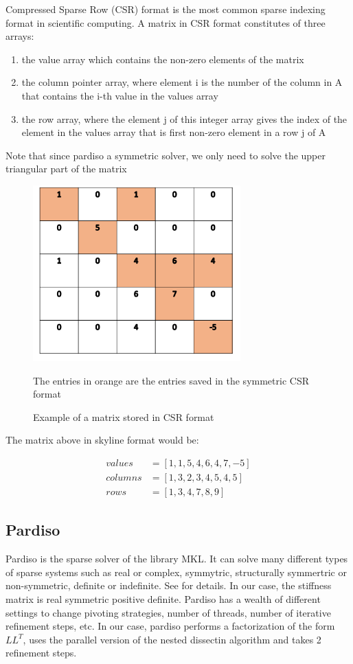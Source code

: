 \documentclass[11pt]{article}
\begin{document}
Compressed Sparse Row (CSR) format is the most common sparse indexing format in scientific computing. A matrix in CSR format constitutes of three arrays:
\begin{enumerate}
\item the value array which contains the non-zero elements of the matrix
\item the column pointer array, where element i is the number of the column in A that contains the i-th value in the values array
\item the row array, where the element j of this integer array gives the index of the element in the values array that is first non-zero element in a row j of A
\end{enumerate}
Note that since pardiso a symmetric solver, we only need to solve the upper triangular part of the matrix
\begin{figure}[H]
\begin{center}

\includegraphics[width=8cm]{csr}
\label{fig:csr}\\
\caption{Example of a matrix stored in CSR format}
The entries in orange are the entries saved in the symmetric CSR format
\end{center}
\end{figure}

The matrix above in skyline format would be:

\begin{align}
values&=[1,1,5,4,6,4,7,-5]\\
columns&= [1,3,2,3,4,5,4,5] \\
rows&= [1,3,4,7,8,9] 
\end{align}

\subsection{Pardiso}
Pardiso is the sparse solver of the library MKL. It can solve many different types of sparse systems such as real or complex, symmytric, structurally symmertric or non-symmetric, definite or indefinite. See \cite{Intel} for details. In our case, the stiffness matrix is real symmetric positive definite. Pardiso has a wealth of different settings to change pivoting strategies, number of threads, number of iterative refinement steps, etc. In our case, pardiso performs a factorization of the form $LL^T$, uses the parallel version of the nested dissectin algorithm and takes 2 refinement steps. 
\end{document}
